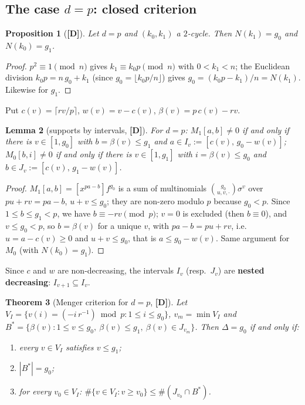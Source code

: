 \documentclass[11pt,a4paper]{article}
\newtheorem{theorem}{Theorem}[section]
\newtheorem{proposition}[theorem]{Proposition}
\newtheorem{lemma}[theorem]{Lemma}
\begin{document}
\subsection*{The case $d=p$: closed criterion}

\begin{proposition}[\textbf{[D]}]
\label{prop:NG}
Let $d=p$ and $(k_0,k_1)$ a $2$-cycle. Then $N(k_1)=g_0$ and $N(k_0)=g_1$.
\end{proposition}

\begin{proof}
$p^2\equiv1\pmod n$ gives $k_1\equiv k_0p\pmod n$ with $0<k_1<n$; the Euclidean
division $k_0p=n\,g_0+k_1$ (since $g_0=\lfloor k_0p/n\rfloor$) gives
$g_0=(k_0p-k_1)/n=N(k_1)$. Likewise for $g_1$. \end{proof}

Put $c(v)=\lceil rv/p\rceil$, $w(v)=v-c(v)$, $\beta(v)=p\,c(v)-rv$.

\begin{lemma}[supports by intervals, \textbf{[D]}]
\label{lem:interv}
For $d=p$: $M_1[a,b]\neq0$ if and only if there is $v\in[1,g_0]$ with
$b=\beta(v)\le g_1$ and $a\in I_v:=[c(v),\,g_0-w(v)]$; $M_0[b,i]\neq0$ if and
only if there is $v\in[1,g_1]$ with $i=\beta(v)\le g_0$ and
$b\in J_v:=[c(v),\,g_1-w(v)]$.
\end{lemma}

\begin{proof}
$M_1[a,b]=[x^{pa-b}]f^{g_0}$ is a sum of multinomials
$\binom{g_0}{u,v,\cdot}\sigma^v$ over $pu+rv=pa-b$, $u+v\le g_0$; they are
non-zero modulo $p$ because $g_0<p$. Since $1\le b\le g_1<p$, we have
$b\equiv-rv\pmod p$; $v=0$ is excluded (then $b\equiv0$), and $v\le g_0<p$, so
$b=\beta(v)$ for a unique $v$, with $pa-b=pu+rv$, i.e.\ $u=a-c(v)\ge0$ and
$u+v\le g_0$, that is $a\le g_0-w(v)$. Same argument for $M_0$ (with
$N(k_0)=g_1$). \end{proof}

Since $c$ and $w$ are non-decreasing, the intervals $I_v$ (resp.\ $J_v$) are
\textbf{nested decreasing}: $I_{v+1}\subseteq I_v$.

\begin{theorem}[Menger criterion for $d=p$, \textbf{[D]}]
\label{thm:dp}
Let $V_I=\{v(i)=(-i\,r^{-1})\bmod p:1\le i\le g_0\}$, $v_m=\min V_I$ and
$B^*=\{\beta(v):1\le v\le g_0,\ \beta(v)\le g_1,\ \beta(v)\in J_{v_m}\}$. Then
$\Delta=g_0$ if and only if:
\begin{enumerate}
\item every $v\in V_I$ satisfies $v\le g_1$;
\item $|B^*|=g_0$;
\item for every $v_0\in V_I$: $\#\{v\in V_I:v\ge v_0\}\le\#(J_{v_0}\cap B^*)$.
\end{enumerate}
\end{theorem}
\end{document}
